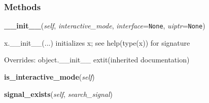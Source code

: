   \subsubsection{Methods}

    \vspace{0.5ex}

\hspace{.8\funcindent}\begin{boxedminipage}{\funcwidth}

    \raggedright \textbf{\_\_init\_\_}(\textit{self}, \textit{interactive\_mode}, \textit{interface}={\tt None}, \textit{uiptr}={\tt None})

\setlength{\parskip}{2ex}
    x.\_\_init\_\_(...) initializes x; see help(type(x)) for signature

\setlength{\parskip}{1ex}
      Overrides: object.\_\_init\_\_ 	extit{(inherited documentation)}

    \end{boxedminipage}

    \label{htd_hpl_signal_manager:hpl_SignalManager:is_interactive_mode}

    \vspace{0.5ex}

\hspace{.8\funcindent}\begin{boxedminipage}{\funcwidth}

    \raggedright \textbf{is\_interactive\_mode}(\textit{self})

\setlength{\parskip}{2ex}
\setlength{\parskip}{1ex}
    \end{boxedminipage}

    \label{htd_hpl_signal_manager:hpl_SignalManager:signal_exists}

    \vspace{0.5ex}

\hspace{.8\funcindent}\begin{boxedminipage}{\funcwidth}

    \raggedright \textbf{signal\_exists}(\textit{self}, \textit{search\_signal})

\setlength{\parskip}{2ex}
\setlength{\parskip}{1ex}
    \end{boxedminipage}

